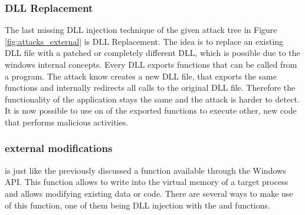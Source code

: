 \subsubsection{DLL Replacement}
The last missing DLL injection technique of the given attack tree in Figure \ref{fig:attacks_external} is DLL Replacement. The idea is to replace an existing DLL file with a patched or completely different DLL, which is possible due to the windows internal concepts. Every DLL exports functions that can be called from a program. The attack know creates a new DLL file, that exports the same functions and internally redirects all calls to the original DLL file. Therefore the functionality of the application stays the same and the attack is harder to detect. It is now possible to use on of the exported functions to execute other, new code that performs malicious activities.

\subsubsection{ external modifications}
 is just like the previously discussed  a function available through the Windows API. This function allows to write into the virtual memory of a target process and allows modifying existing data or code. There are several ways to make use of this function, one of them being DLL injection with the  and  functions. 

